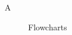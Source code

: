 
\chapter*{\appendixlistname}

\begin{description}
    \item[\appendixname{} A] Flowcharts
\end{description}

